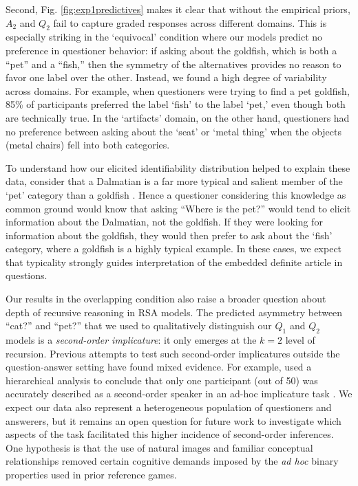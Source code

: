 \documentclass[11pt, floatsintext]{apa6}
\begin{document}
Second, Fig. \ref{fig:exp1predictives} makes it clear that without the empirical priors, $A_2$ and $Q_2$ fail to capture graded responses across different domains. 
This is especially striking in the `equivocal' condition where our models predict no preference in questioner behavior: if asking about the goldfish, which is both a ``pet'' and a ``fish,'' then the symmetry of the alternatives provides no reason to favor one label over the other. 
Instead, we found a high degree of variability across domains. 
For example, when questioners were trying to find a pet goldfish, 85\% of participants preferred the label `fish' to the label `pet,' even though both are technically true. 
In the `artifacts' domain, on the other hand, questioners had no preference between asking about the `seat' or `metal thing' when the objects (metal chairs) fell into both categories.

To understand how our elicited identifiability distribution helped to explain these data, consider that a Dalmatian is a far more typical and salient member of the `pet' category than a goldfish \cite{Rosch75}. 
Hence a questioner considering this knowledge as common ground would know that asking ``Where is the pet?'' would tend to elicit information about the Dalmatian, not the goldfish. 
If they were looking for information about the goldfish, they would then prefer to ask about the `fish' category, where a goldfish is a highly typical example. 
In these cases, we expect that typicality strongly guides interpretation of the embedded definite article in questions.

Our results in the overlapping condition also raise a broader question about depth of recursive reasoning in RSA models.
The predicted asymmetry between ``cat?'' and ``pet?'' that we used to qualitatively distinguish our $Q_1$ and $Q_2$ models is a \emph{second-order implicature}: it only emerges at the $k =2$ level of recursion.
Previous attempts to test such second-order implicatures outside the question-answer setting have found mixed evidence. 
For example,  used a hierarchical analysis to conclude that only one participant (out of 50) was accurately described as a second-order speaker in an ad-hoc implicature task \cite<see also>{frank2017rational}.
We expect our data also represent a heterogeneous population of questioners and answerers, but it remains an open question for future work to investigate which aspects of the task facilitated this higher incidence of second-order inferences.
One hypothesis is that the use of natural images and familiar conceptual relationships removed certain cognitive demands imposed by the \emph{ad hoc} binary properties used in prior reference games.
\end{document}
